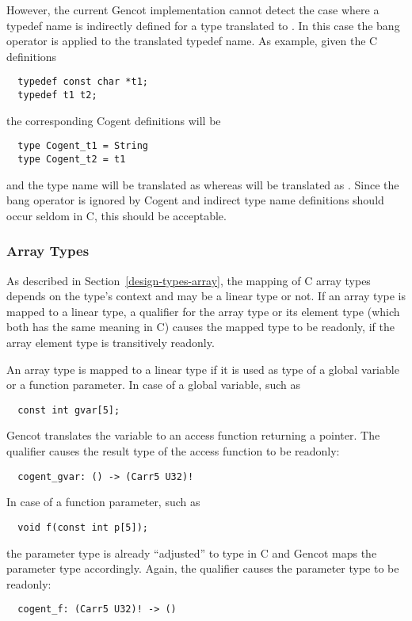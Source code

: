 However, the current Gencot implementation cannot detect the case where a typedef name is indirectly defined for a type
translated to . In this case the bang operator is applied to the translated typedef name. As example, given
the C definitions
\begin{verbatim}
  typedef const char *t1;
  typedef t1 t2;
\end{verbatim}
the corresponding Cogent definitions will be
\begin{verbatim}
  type Cogent_t1 = String
  type Cogent_t2 = t1
\end{verbatim}
and the type name  will be translated as  whereas  will be translated as 
. Since the bang operator is ignored by Cogent and indirect type name definitions should occur seldom 
in C, this should be acceptable.

\subsubsection{Array Types}

As described in Section~\ref{design-types-array}, the mapping of C array types depends on the type's context and may 
be a linear type or not. If an array type is mapped to a linear type, a  qualifier for the array type
or its element type (which both has the same meaning in C) causes the mapped type to be readonly, if the array element 
type is transitively readonly.

An array type is mapped to a linear type if it is used as type of a global variable or a function parameter. In case of
a global variable, such as
\begin{verbatim}
  const int gvar[5];
\end{verbatim}
Gencot translates the variable to an access function returning a pointer. The  qualifier causes the 
result type of the access function to be readonly:
\begin{verbatim}
  cogent_gvar: () -> (Carr5 U32)!
\end{verbatim}
In case of a function parameter, such as
\begin{verbatim}
  void f(const int p[5]);
\end{verbatim}
the parameter type is already ``adjusted'' to type  in C and Gencot maps the parameter type 
accordingly. Again, the  qualifier causes the parameter type to be readonly:
\begin{verbatim}
  cogent_f: (Carr5 U32)! -> ()
\end{verbatim}

